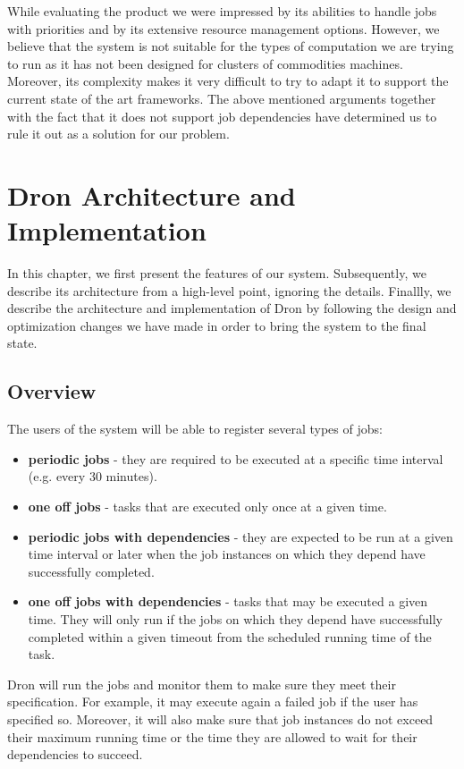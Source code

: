 \documentclass[11pt,a4paper,twoside]{report}
\begin{document}
While evaluating the product we were impressed by its abilities to handle
jobs with priorities and by its extensive resource management options. However,
we believe that the system is not suitable for the types of computation we are
trying to run as it has not been designed for clusters of commodities machines.
Moreover, its complexity makes it very difficult to try to adapt it to support
the current state of the art frameworks. The above mentioned arguments together
with the fact that it does not support job dependencies have determined us to
rule it out as a solution for our problem.


\chapter{Dron Architecture and Implementation}

In this chapter, we first present the features of our system. Subsequently, we describe its architecture from a high-level point, ignoring the details. Finallly, we describe the architecture and implementation of Dron by following the design and optimization changes we have made in order to bring the system to the final state.


\section{Overview}
The users of the system will be able to register several types of jobs:

\begin{itemize}
\item{}
\textbf{periodic jobs} - they are required to be executed at a specific time interval (e.g. every 30 minutes).
\item{}
\textbf{one off jobs} - tasks that are executed only once at a given time.
\item{}
\textbf{periodic jobs with dependencies} - they are expected to be run at a given time interval or later when the job instances on which they depend have successfully completed.
\item{}
\textbf{one off jobs with dependencies} - tasks that may be executed a given time. They will only run if the jobs on which they depend have successfully completed within a given timeout from the scheduled running time of the task.
\end{itemize}


Dron will run the jobs and monitor them to make sure they meet their specification. For example, it may execute again a failed job if the user has specified so. Moreover, it will also make sure that job instances do not exceed their maximum running time or the time they are allowed to wait for their dependencies to succeed.
\end{document}
